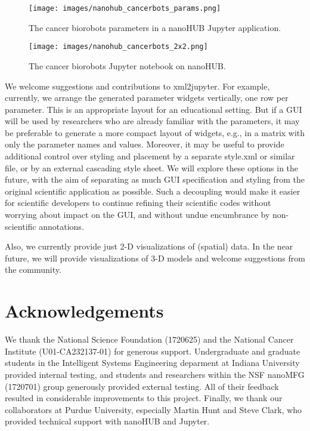\documentclass[10pt,letterpaper]{article}
\begin{document}
\begin{figure}
\centering
\texttt{[image: images/nanohub\_cancerbots\_params.png]}
\caption{The cancer biorobots parameters in a nanoHUB Jupyter
application.}
\end{figure}

\begin{figure}
\centering
\texttt{[image: images/nanohub\_cancerbots\_2x2.png]}
\caption{The cancer biorobots Jupyter notebook on nanoHUB.}
\end{figure}

We welcome suggestions and contributions to xml2jupyter. For example,
currently, we arrange the generated parameter widgets vertically, one
row per parameter. This is an appropriate layout for an educational
setting. But if a GUI will be used by researchers who are already
familiar with the parameters, it may be preferable to generate a more
compact layout of widgets, e.g., in a matrix with only the parameter
names and values. Moreover, it may be useful to provide additional
control over styling and placement by a separate style.xml or similar
file, or by an external cascading style sheet. We will explore these
options in the future, with the aim of separating as much GUI
specification and styling from the original scientific application as
possible. Such a decoupling would make it easier for scientific
developers to continue refining their scientific codes without worrying
about impact on the GUI, and without undue encumbrance by non-scientific
annotations.

Also, we currently provide just 2-D visualizations of (spatial) data. In
the near future, we will provide visualizations of 3-D models and
welcome suggestions from the community.

\section*{Acknowledgements}

We thank the National Science Foundation (1720625) and the National
Cancer Institute (U01-CA232137-01) for generous support. Undergraduate
and graduate students in the Intelligent Systems Engineering deparment
at Indiana University provided internal testing, and students and
researchers within the NSF nanoMFG (1720701) group generously provided
external testing. All of their feedback resulted in considerable
improvements to this project. Finally, we thank our collaborators at
Purdue University, especially Martin Hunt and Steve Clark, who provided
technical support with nanoHUB and Jupyter.


\end{document}
